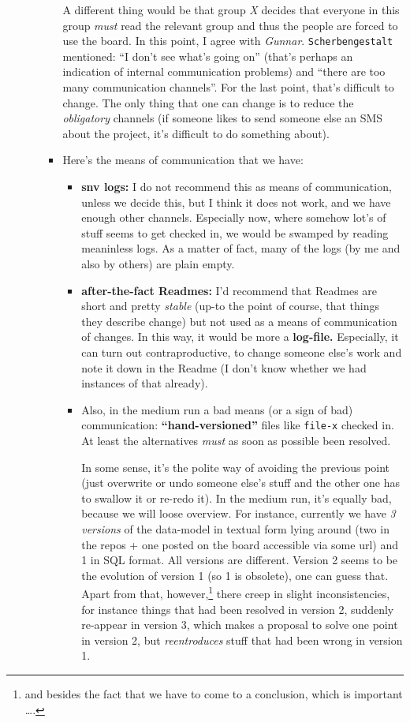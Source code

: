 \documentclass[11pt,handout,nologo]{handout}
\begin{document}
\begin{itemize}
\begin{itemize}
\begin{itemize}
      A different thing would be that group \emph{X} decides that everyone
      in this group \emph{must} read the relevant group and thus the people
      are forced to use the board. In this point, I agree with
      \emph{Gunnar}. \texttt{Scherbengestalt} mentioned: ``I don't see
      what's going on'' (that's perhaps an indication of internal
      communication problems) and ``there are too many communication
      channels''. For the last point, that's difficult to change. The only
      thing that one can change is to reduce the \emph{obligatory} channels
      (if someone likes to send someone else an SMS about the project, it's
      difficult to do something about).
    \item Here's the means of communication that we have:
      \begin{itemize}
      \item \textbf{snv logs:} I do not recommend this as means of
        communication, unless we decide this, but I think it does not work,
        and we have enough other channels. Especially now, where somehow
        lot's of stuff seems to get checked in, we would be swamped by
        reading meaninless logs. As a matter of fact, many of the logs (by
        me and also by others) are plain empty.
      \item \textbf{after-the-fact Readmes:} I'd recommend that Readmes are
        short and pretty \emph{stable} (up-to the point of course, that
        things they describe change) but not used as a means of
        communication of changes. In this way, it would be more a
        \textbf{log-file.}  Especially, it can turn out contraproductive,
        to change someone else's work and note it down in the Readme (I
        don't know whether we had instances of that already).
      \item Also, in the medium run a bad means (or a sign of bad)
        communication: \textbf{``hand-versioned''} files like
        \texttt{file-x} checked in. At least the alternatives \emph{must}
        as soon as possible been resolved.
        
        In some sense, it's the polite way of avoiding the previous point
        (just overwrite or undo someone else's stuff and the other one has
        to swallow it or re-redo it). In the medium run, it's equally bad,
        because we will loose overview. For instance, currently we have
        \emph{3 versions} of the data-model in textual form lying around
        (two in the repos + one posted on the board accessible via some
        url) and 1 in SQL format. All versions are different. Version 2
        seems to be the evolution of version 1 (so 1 is obsolete), one can
        guess that. Apart from that, however,\footnote{and besides the fact
          that we have to come to a conclusion, which is important \ldots.}
        there creep in slight inconsistencies, for instance things that had
        been resolved in version 2, suddenly re-appear in version 3, which
        makes a proposal to solve one point in version 2, but
        \emph{reentroduces} stuff that had been wrong in version 1.
        

\end{itemize}
\end{itemize}
\end{itemize}
\end{itemize}
\end{document}
